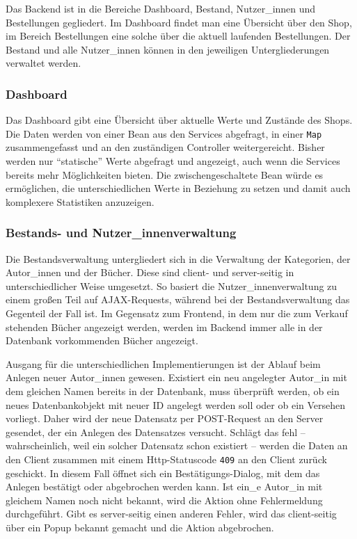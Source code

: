 	Das Backend ist in die Bereiche Dashboard, Bestand, Nutzer\_innen und Bestellungen gegliedert. Im Dashboard findet man eine Übersicht über den Shop, im Bereich Bestellungen eine solche über die aktuell laufenden Bestellungen. Der Bestand und alle Nutzer\_innen können in den jeweiligen Untergliederungen verwaltet werden.
	
		\subsubsection{Dashboard}
		Das Dashboard gibt eine Übersicht über aktuelle Werte und Zustände des Shops. Die Daten werden von einer Bean aus den Services abgefragt, in einer \lstinline|Map| zusammengefasst und an den zuständigen Controller weitergereicht. Bisher werden nur "`statische"' Werte abgefragt und angezeigt, auch wenn die Services bereits mehr Möglichkeiten bieten. Die zwischengeschaltete Bean würde es ermöglichen, die unterschiedlichen Werte in Beziehung zu setzen und damit auch komplexere Statistiken anzuzeigen.
	
		\subsubsection{Bestands- und Nutzer\_innenverwaltung}
		Die Bestandsverwaltung untergliedert sich in die Verwaltung der Kategorien, der Autor\_innen und der Bücher. Diese sind client- und server-seitig in unterschiedlicher Weise umgesetzt. So basiert die Nutzer\_innenverwaltung zu einem großen Teil auf AJAX-Requests, während bei der Bestandsverwaltung das Gegenteil der Fall ist. Im Gegensatz zum Frontend, in dem nur die zum Verkauf stehenden Bücher angezeigt werden, werden im Backend immer alle in der Datenbank vorkommenden Bücher angezeigt.
		
		Ausgang für die unterschiedlichen Implementierungen ist der Ablauf beim Anlegen neuer Autor\_innen gewesen. Existiert ein neu angelegter Autor\_in mit dem gleichen Namen bereits in der Datenbank, muss überprüft werden, ob ein neues Datenbankobjekt mit neuer ID angelegt werden soll oder ob ein Versehen vorliegt. Daher wird der neue Datensatz per POST-Request an den Server gesendet, der ein Anlegen des Datensatzes versucht. Schlägt das fehl -- wahrscheinlich, weil ein solcher Datensatz schon existiert -- werden die Daten an den Client zusammen mit einem Http-Statuscode \lstinline|409| an den Client zurück geschickt. In diesem Fall öffnet sich ein Bestätigungs-Dialog, mit dem das Anlegen bestätigt oder abgebrochen werden kann. Ist ein\_e Autor\_in mit gleichem Namen noch nicht bekannt, wird die Aktion ohne Fehlermeldung durchgeführt. Gibt es server-seitig einen anderen Fehler, wird das client-seitig über ein Popup bekannt gemacht und die Aktion abgebrochen.
		
